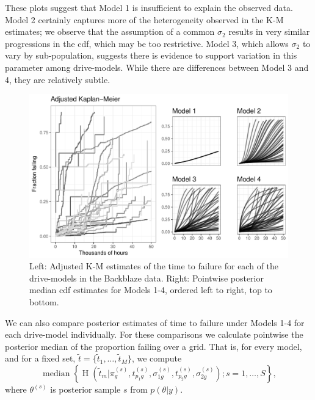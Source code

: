 \documentclass[12pt]{article}
\newcommand{\op}{\operatorname}
\begin{document}
These plots suggest that Model 1 is insufficient to explain the observed data. Model 2 certainly captures more of the heterogeneity observed in the K-M estimates; we observe that the assumption of a common $\sigma_2$ results in very similar progressions in the cdf, which may be too restrictive. Model 3, which allows $\sigma_2$ to vary by sub-population, suggests there is evidence to support variation in this parameter among drive-models. While there are differences between Model 3 and 4, they are relatively subtle.

\begin{figure}[H]
\includegraphics[width=\textwidth]{heterogeneity-compare}
\caption{Left: Adjusted K-M estimates of the time to failure for each of the drive-models in the Backblaze data. Right: Pointwise posterior median cdf estimates for Models 1-4, ordered left to right, top to bottom.}
\label{fig:fig2}
\end{figure}

We can also compare posterior estimates of time to failure under Models 1-4 for each drive-model individually.  For these comparisons we calculate pointwise the posterior median of the proportion failing over a grid. That is, for every model, and for a fixed set, $\tilde{t}=\{\tilde{t}_1,\ldots,\tilde{t}_M\}$, we compute 
\begin{equation}
\label{pointwise-medians}
\op{median}\left\{\op{H}\left(\tilde{t}_m|\pi_{g}^{(s)},t_{p_{1}g}^{(s)},\sigma_{1g}^{(s)},t_{p_{2}g}^{(s)},\sigma_{2g}^{(s)}\right);s=1,\ldots,S \right\},
\end{equation}
where $\theta^{(s)}$ is posterior sample $s$ from $p(\theta|y)$.
\end{document}
